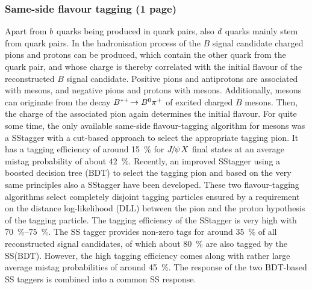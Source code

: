 
\subsubsection{Same-side flavour tagging (1 page)}
\label{sec:detecor:software:tagging:sstagger}

Apart from ${b}$ quarks being produced in \bbbar quark pairs, also
${d}$ quarks mainly stem from \ddbar quark pairs. In the hadronisation
process of the $B$ signal candidate charged pions and protons can be produced,
which contain the other quark from the \ddbar quark pair, and whose charge is
thereby correlated with the initial flavour of the reconstructed $B$ signal
candidate. Positive pions and antiprotons are associated with \Bz mesons, and
negative pions and protons with \Bzb mesons. Additionally, \Bd mesons can
originate from the decay $B^{*+}\!\rightarrow{\ensuremath{{B}^0}}{\ensuremath{{\pi}^+}}$ of excited charged $B$ mesons.
Then, the charge of the associated pion again determines the initial flavour.
For quite some time, the only available same-side flavour-tagging algorithm for
\Bz mesons was a SS\pion tagger with a cut-based approach to select the
appropriate tagging pion. It has a tagging efficiency of around
\SI{15}{\percent} for ${{J\mskip -3mu/\mskip -2mu\psi\mskip 2mu}}X$ final states at an average mistag probability
of about \SI{42}{\percent}. Recently, an improved SS\pion tagger using a
boosted decision tree (BDT) to select the tagging pion and based on the very
same principles also a SS\proton tagger have been
developed\cite{CERN-THESIS-2015-040,LHCb-PAPER-2016-039}. These two
flavour-tagging algorithms select completely disjoint tagging particles
ensured by a requirement on the distance log-likelihood (DLL) between the pion
and the proton hypothesis of the tagging particle. The tagging efficiency of
the SS\pion tagger is very high with \SIrange{70}{75}{\percent}. The SS\proton
tagger provides non-zero tags for around \SI{35}{\percent} of all
reconstructed signal candidates, of which about \SI{80}{\percent} are also
tagged by the SS\pion (BDT). However, the high tagging efficiency comes along
with rather large average mistag probabilities of around \SI{45}{\percent}.
The response of the two BDT-based SS taggers is combined into a common SS
response.